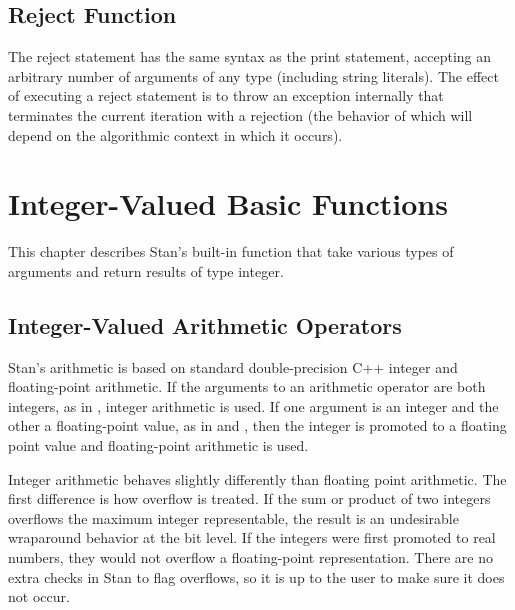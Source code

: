 \section{Reject Function}

The reject statement has the same syntax as the print statement, accepting an arbitrary number of arguments of any type (including string literals).   The effect of executing a reject statement is to throw an exception internally that terminates the current iteration with a rejection (the behavior of which will depend on the algorithmic context in which it occurs).

\begin{description}    \end{description}

\chapter{Integer-Valued Basic Functions}

This chapter describes Stan's built-in function that take various types of arguments and return results of type integer.

\section{Integer-Valued Arithmetic Operators}

Stan's arithmetic is based on standard double-precision C++ integer and floating-point arithmetic.  If the arguments to an arithmetic operator are both integers, as in , integer arithmetic is used.  If one argument is an integer and the other a floating-point value, as in  and , then the integer is promoted to a floating point value and floating-point arithmetic is used.

Integer arithmetic behaves slightly differently than floating point arithmetic.  The first difference is how overflow is treated.  If the sum or product of two integers overflows the maximum integer representable, the result is an undesirable wraparound behavior at the bit level.  If the integers were first promoted to real numbers, they would not overflow a floating-point representation.  There are no extra checks in Stan to flag overflows, so it is up to the user to make sure it does not occur.

